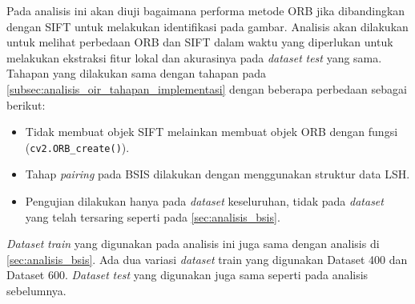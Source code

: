 Pada analisis ini akan diuji bagaimana performa metode ORB jika dibandingkan dengan SIFT untuk melakukan identifikasi pada gambar. Analisis akan dilakukan untuk melihat perbedaan ORB dan SIFT dalam waktu yang diperlukan untuk melakukan ekstraksi fitur lokal dan akurasinya pada \textit{dataset} \textit{test} yang sama. Tahapan yang dilakukan sama dengan tahapan pada \ref{subsec:analisis_oir_tahapan_implementasi} dengan beberapa perbedaan sebagai berikut:
\begin{itemize}
	\item Tidak membuat objek SIFT melainkan membuat objek ORB dengan fungsi (\texttt{cv2.ORB\_create()}).
	\item Tahap \textit{pairing} pada BSIS dilakukan dengan menggunakan struktur data LSH. 
	\item Pengujian dilakukan hanya pada \textit{dataset} keseluruhan, tidak pada \textit{dataset} yang telah tersaring seperti pada \ref{sec:analisis_bsis}.
\end{itemize}
\textit{Dataset} \textit{train} yang digunakan pada analisis ini juga sama dengan analisis di \ref{sec:analisis_bsis}. Ada dua variasi \textit{dataset} train yang digunakan Dataset 400 dan Dataset 600. \textit{Dataset} \textit{test} yang digunakan juga sama seperti pada analisis sebelumnya.

